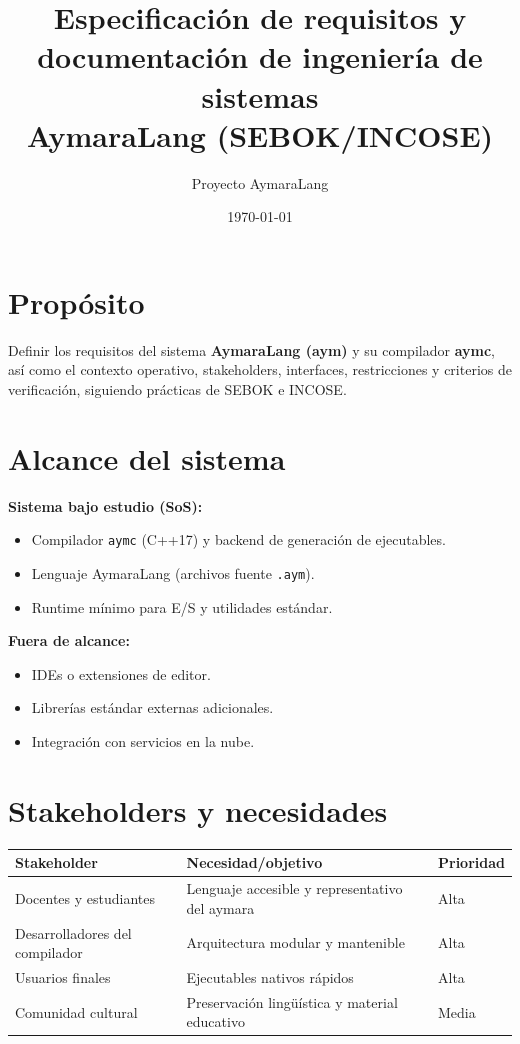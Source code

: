 \documentclass[11pt,a4paper]{article}
\title{Especificación de requisitos y documentación de ingeniería de sistemas\\AymaraLang (SEBOK/INCOSE)}
\author{Proyecto AymaraLang}
\date{\today}
\begin{document}
\maketitle

\section{Propósito}
Definir los requisitos del sistema \textbf{AymaraLang (aym)} y su compilador \textbf{aymc}, así como el contexto operativo, stakeholders, interfaces, restricciones y criterios de verificación, siguiendo prácticas de SEBOK e INCOSE.

\section{Alcance del sistema}
\textbf{Sistema bajo estudio (SoS):}
\begin{itemize}
    \item Compilador \texttt{aymc} (C++17) y backend de generación de ejecutables.
    \item Lenguaje AymaraLang (archivos fuente \texttt{.aym}).
    \item Runtime mínimo para E/S y utilidades estándar.
\end{itemize}

\textbf{Fuera de alcance:}
\begin{itemize}
    \item IDEs o extensiones de editor.
    \item Librerías estándar externas adicionales.
    \item Integración con servicios en la nube.
\end{itemize}

\section{Stakeholders y necesidades}
\begin{longtable}{@{}p{4cm}p{8cm}p{2cm}@{}}
\toprule
\textbf{Stakeholder} & \textbf{Necesidad/objetivo} & \textbf{Prioridad} \\ \midrule
Docentes y estudiantes & Lenguaje accesible y representativo del aymara & Alta \\
Desarrolladores del compilador & Arquitectura modular y mantenible & Alta \\
Usuarios finales & Ejecutables nativos rápidos & Alta \\
Comunidad cultural & Preservación lingüística y material educativo & Media \\ \bottomrule
\end{longtable}
\end{document}
